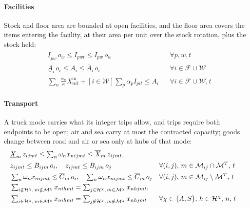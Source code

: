 \documentclass[review,11pt,nonatbib]{elsarticle}
\theoremstyle{remark}
\newcommand{\Xin}{X^{\mathrm{in}}}
\begin{document}
\paragraph{Facilities} Stock and floor area are bounded at open facilities, and the floor area covers the items entering the facility, at their area per unit over the stock rotation, plus the stock held:
\begin{align}
& \underline{I}_{pw}\, o_w \le I_{pwt} \le \overline{I}_{pw}\, o_w && \forall p, w, t \label{eq:stock}\\
& \underline{A}_i\, o_i \le A_i \le \overline{A}_i\, o_i && \forall i \in \mathcal{F} \cup \mathcal{W} \label{eq:area}\\
& \textstyle\sum_{n} \frac{\alpha_n}{\kappa} \Xin_{nit} + [i \in \mathcal{W}] \sum_{p} \alpha_p I_{pit} \le A_i && \forall i \in \mathcal{F} \cup \mathcal{W}, t \label{eq:area-use}
\end{align}

\paragraph{Transport} A truck mode carries what its integer trips allow, and trips require both endpoints to be open; air and sea carry at most the contracted capacity; goods change between road and air or sea only at hubs of that mode:
\begin{align}
& \underline{X}_m\, z_{ijmt} \le \textstyle\sum_n \omega_n x_{nijmt} \le \overline{X}_m\, z_{ijmt}, \notag\\
& z_{ijmt} \le B_{ijm}\, o_i, \quad z_{ijmt} \le B_{ijm}\, o_j && \forall (i,j),\, m \in \mathcal{M}_{ij} \cap \mathcal{M}^T,\, t \label{eq:trucks}\\
& \textstyle\sum_n \omega_n x_{nijmt} \le \overline{C}_m\, o_i, \quad \sum_n \omega_n x_{nijmt} \le \overline{C}_m\, o_j && \forall (i,j),\, m \in \mathcal{M}_{ij} \setminus \mathcal{M}^T,\, t \label{eq:contracted}\\
& \textstyle\sum_{i \notin \mathcal{H}^{\chi},\, m \notin \mathcal{M}^{\chi}} x_{nihmt} = \sum_{j \in \mathcal{H}^{\chi},\, m \in \mathcal{M}^{\chi}} x_{nhjmt}, \notag\\
& \textstyle\sum_{i \in \mathcal{H}^{\chi},\, m \in \mathcal{M}^{\chi}} x_{nihmt} = \sum_{j \notin \mathcal{H}^{\chi},\, m \notin \mathcal{M}^{\chi}} x_{nhjmt} && \forall \chi \in \{A, S\},\, h \in \mathcal{H}^{\chi},\, n,\, t \label{eq:hubs}
\end{align}
\end{document}
